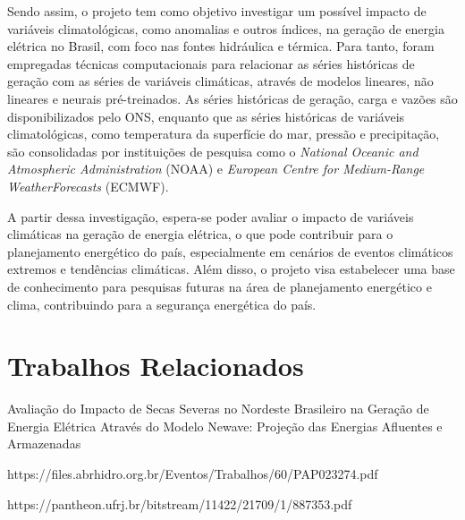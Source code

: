 Sendo assim, o projeto tem como objetivo investigar um possível impacto de variáveis climatológicas, como anomalias e 
outros índices, na geração de energia elétrica no Brasil, com foco nas fontes hidráulica e térmica. Para tanto, foram 
empregadas técnicas computacionais para relacionar as séries históricas de geração com as séries de variáveis climáticas, 
através de modelos lineares, não lineares e neurais pré-treinados. As séries históricas de geração, carga e vazões são 
disponibilizados pelo ONS, enquanto que as séries históricas de variáveis climatológicas,
como temperatura da superfície do mar, pressão e precipitação, são consolidadas por instituições de pesquisa como o
\textit{National Oceanic and Atmospheric Administration} (NOAA) e \textit{European Centre for Medium-Range WeatherForecasts} (ECMWF).

A partir dessa investigação, espera-se poder avaliar o impacto de variáveis climáticas na geração de energia elétrica,
o que pode contribuir para o planejamento energético do país, especialmente em cenários de eventos climáticos extremos e
tendências climáticas. Além disso, o projeto visa estabelecer uma base de conhecimento para pesquisas futuras na área de
planejamento energético e clima, contribuindo para a segurança energética do país.

\chapter{Trabalhos Relacionados}
Avaliação do Impacto de Secas Severas no Nordeste Brasileiro na Geração de Energia Elétrica Através do Modelo Newave: 
Projeção das Energias Afluentes e Armazenadas \cite{Vilar2020}

{https://files.abrhidro.org.br/Eventos/Trabalhos/60/PAP023274.pdf}

{https://pantheon.ufrj.br/bitstream/11422/21709/1/887353.pdf}